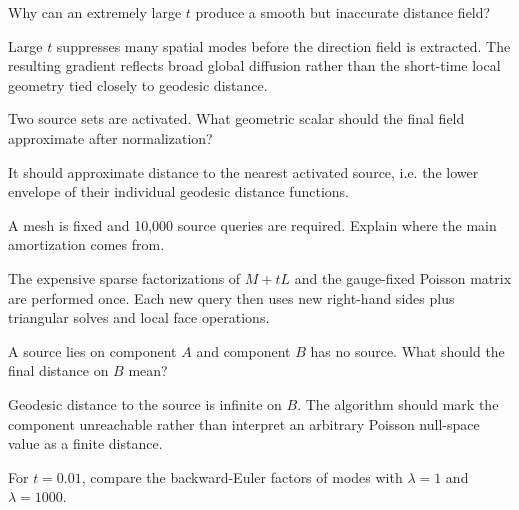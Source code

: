 \begin{problem}\label{prob:vii40-07}
Why can an extremely large \(t\) produce a smooth but inaccurate distance field?
\end{problem}

\begin{solution}
Large \(t\) suppresses many spatial modes before the direction field is extracted.  The resulting gradient reflects broad global diffusion rather than the short-time local geometry tied closely to geodesic distance.
\end{solution}

\begin{problem}\label{prob:vii40-08}
Two source sets are activated.  What geometric scalar should the final field approximate after normalization?
\end{problem}

\begin{solution}
It should approximate distance to the nearest activated source, i.e. the lower envelope of their individual geodesic distance functions.
\end{solution}

\begin{problem}\label{prob:vii40-09}
A mesh is fixed and 10,000 source queries are required.  Explain where the main amortization comes from.
\end{problem}

\begin{solution}
The expensive sparse factorizations of \(M+tL\) and the gauge-fixed Poisson matrix are performed once.  Each new query then uses new right-hand sides plus triangular solves and local face operations.
\end{solution}

\begin{problem}\label{prob:vii40-10}
A source lies on component \(A\) and component \(B\) has no source.  What should the final distance on \(B\) mean?
\end{problem}

\begin{solution}
Geodesic distance to the source is infinite on \(B\).  The algorithm should mark the component unreachable rather than interpret an arbitrary Poisson null-space value as a finite distance.
\end{solution}

\begin{problem}\label{prob:vii40-11}
For \(t=0.01\), compare the backward-Euler factors of modes with \(\lambda=1\) and \(\lambda=1000\).
\end{problem}

